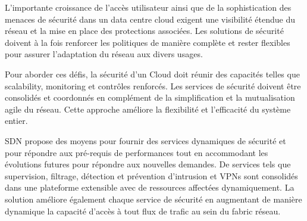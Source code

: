 
L'importante croissance de l'accès utilisateur ainsi que de la sophistication des menaces de sécurité dans un data centre cloud exigent une visibilité étendue du réseau et la mise en place des protections associées. Les solutions de sécurité doivent à la fois renforcer les politiques de manière complète et rester flexibles pour assurer l'adaptation du réseau aux divers usages.


Pour aborder ces défis, la sécurité d'un Cloud doit réunir des capacités telles que \gls{scalability}, monitoring et contrôles renforcés. Les services de sécurité doivent être consolidés et coordonnés en complément de la simplification et la mutualisation agile du réseau. Cette approche améliore la flexibilité et l'efficacité du système entier.

SDN propose des moyens pour fournir des services dynamiques de sécurité et pour répondre aux pré-requis de performances tout en accommodant les évolutions futures pour répondre aux nouvelles demandes. De services tels que supervision, filtrage, détection et prévention d'intrusion et VPNs sont consolidés dans une plateforme extensible avec de ressources affectées dynamiquement. La solution améliore également chaque service de sécurité en augmentant de manière dynamique la capacité d'accès à tout flux de trafic au sein du \gls{fabric} réseau.

